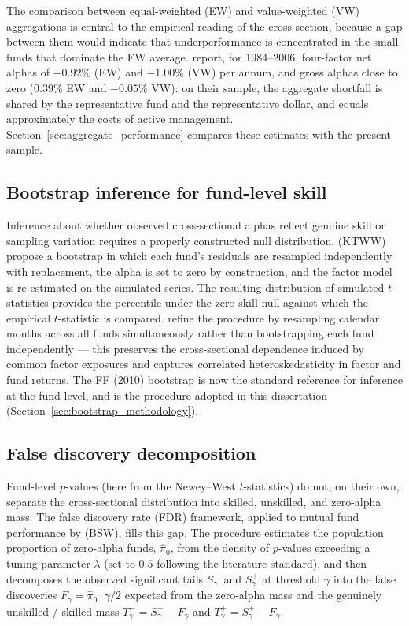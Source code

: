 \documentclass[12pt, oneside]{report}
\begin{document}
The comparison between equal-weighted (EW) and value-weighted (VW)
aggregations is central to the empirical reading of the cross-section,
because a gap between them would indicate that underperformance is
concentrated in the small funds that dominate the EW average.
\textcite{FamaFrench2010} report, for 1984--2006, four-factor net alphas
of $-0.92\%$ (EW) and $-1.00\%$ (VW) per annum,
and gross alphas close to zero ($0.39\%$ EW and $-0.05\%$ VW): on their
sample, the aggregate shortfall is shared by the representative fund and
the representative dollar, and equals approximately the costs of active
management. Section~\ref{sec:aggregate_performance} compares these
estimates with the present sample.

\subsection{Bootstrap inference for fund-level skill}
\label{sec:bs_lit}

\noindent Inference about whether observed cross-sectional alphas reflect
genuine skill or sampling variation requires a properly constructed null
distribution. \textcite{KosowskiTimmermannWermersWhite2006} (KTWW) propose
a bootstrap in which each fund's residuals are resampled independently
with replacement, the alpha is set to zero by construction, and the
factor model is re-estimated on the simulated series. The resulting
distribution of simulated $t$-statistics provides the percentile under
the zero-skill null against which the empirical $t$-statistic is compared.
\textcite{FamaFrench2010} refine the procedure by resampling calendar
months across all funds simultaneously rather than bootstrapping each
fund independently --- this preserves the cross-sectional dependence
induced by common factor exposures and captures correlated
heteroskedasticity in factor and fund returns. The FF (2010) bootstrap is now the
standard reference for inference at the fund level, and is the procedure
adopted in this dissertation (Section~\ref{sec:bootstrap_methodology}).

\subsection{False discovery decomposition}
\label{sec:fdr_lit}

\noindent Fund-level $p$-values (here from the Newey--West
$t$-statistics) do not, on their own, separate the cross-sectional distribution into
skilled, unskilled, and zero-alpha mass. The
\textcite{Storey2002} false discovery rate (FDR) framework, applied to
mutual fund performance by \textcite{BarrasScailletWermers2010} (BSW),
fills this gap. The procedure estimates the population proportion of
zero-alpha funds, $\hat{\pi}_0$, from the density of $p$-values
exceeding a tuning parameter $\lambda$ (set to $0.5$ following the
literature standard), and then decomposes the observed significant tails
$S^-_\gamma$ and $S^+_\gamma$ at threshold $\gamma$ into the false
discoveries $F_\gamma = \hat{\pi}_0 \cdot \gamma / 2$ expected from the
zero-alpha mass and the genuinely unskilled / skilled mass
$T^-_\gamma = S^-_\gamma - F_\gamma$ and $T^+_\gamma = S^+_\gamma - F_\gamma$.
\end{document}
